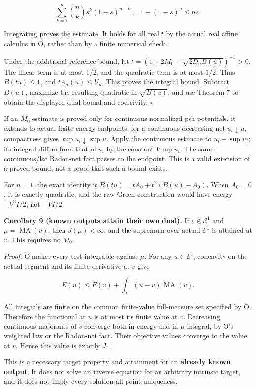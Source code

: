 \documentclass[
  11pt,
]{article}
\begin{document}
\[
\sum_{k=1}^n\binom nk s^k(1-s)^{n-k}
=1-(1-s)^n\leq ns.
\]

Integrating proves the estimate. It holds for all real \(t\) by the
actual real affine calculus in O, rather than by a finite numerical
check.

Under the additional reference bound, let
\(t=(1+2M_0+\sqrt{2D_nB(u)})^{-1}>0\). The linear term is at most
\(1/2\), and the quadratic term is at most \(1/2\). Thus \(B(tu)\leq1\),
and \(tA_\mu(u)\leq U_\mu\). This proves the integral bound. Subtract
\(B(u)\), maximize the resulting quadratic in \(\sqrt{B(u)}\), and use
Theorem 7 to obtain the displayed dual bound and coercivity. \(\square\)

If an \(M_0\) estimate is proved only for continuous normalized psh
potentials, it extends to actual finite-energy endpoints: for a
continuous decreasing net \(u_i\downarrow u\), compactness gives
\(\sup u_i\downarrow\sup u\). Apply the continuous estimate to
\(u_i-\sup u_i\); its integral differs from that of \(u_i\) by the
constant \(V\sup u_i\). The same continuous/lsc Radon-net fact passes to
the endpoint. This is a valid extension of a proved bound, not a proof
that such a bound exists.

For \(n=1\), the exact identity is \(B(tu)=tA_0+t^2(B(u)-A_0)\). When
\(A_0=0\), it is exactly quadratic, and the raw Green construction would
have energy \(-V^2I/2\), not \(-VI/2\).

\textbf{Corollary 9 (known outputs attain their own dual).} If
\(v\in\mathcal E^1\) and \(\mu=\operatorname{MA}(v)\), then
\(J(\mu)<\infty\), and the supremum over actual \(\mathcal E^1\) is
attained at \(v\). This requires no \(M_0\).

\emph{Proof.} O makes every test integrable against \(\mu\). For any
\(u\in\mathcal E^1\), concavity on the actual segment and its finite
derivative at \(v\) give

\[
E(u)\leq E(v)+\int_T(u-v)\,\operatorname{MA}(v).
\]

All integrals are finite on the common finite-value full-measure set
specified by O. Therefore the functional at \(u\) is at most its finite
value at \(v\). Decreasing continuous majorants of \(v\) converge both
in energy and in \(\mu\)-integral, by O's weighted law or the Radon-net
fact. Their objective values converge to the value at \(v\). Hence this
value is exactly \(J\). \(\square\)

This is a necessary target property and attainment for an
\textbf{already known output}. It does not solve an inverse equation for
an arbitrary intrinsic target, and it does not imply every-solution
all-point uniqueness.
\end{document}
